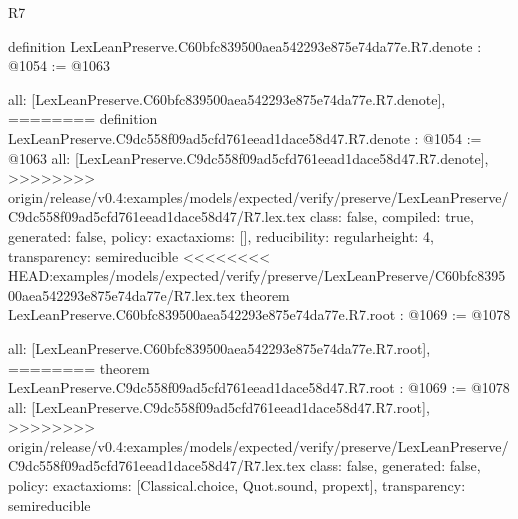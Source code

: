 \begin{lexlean}{R7}
\begin{coremodule}
{{{{{{{{{{{definition LexLeanPreserve.C60bfc839500aea542293e875e74da77e.R7.denote : @1054 := @1063 {
  all: [LexLeanPreserve.C60bfc839500aea542293e875e74da77e.R7.denote],
========
definition LexLeanPreserve.C9dc558f09ad5cfd761eead1dace58d47.R7.denote : @1054 := @1063 {
  all: [LexLeanPreserve.C9dc558f09ad5cfd761eead1dace58d47.R7.denote],
>>>>>>>> origin/release/v0.4:examples/models/expected/verify/preserve/LexLeanPreserve/C9dc558f09ad5cfd761eead1dace58d47/R7.lex.tex
  class: false,
  compiled: true,
  generated: false,
  policy: exact{axioms: []},
  reducibility: regular{height: 4},
  transparency: semireducible
}
<<<<<<<< HEAD:examples/models/expected/verify/preserve/LexLeanPreserve/C60bfc839500aea542293e875e74da77e/R7.lex.tex
theorem LexLeanPreserve.C60bfc839500aea542293e875e74da77e.R7.root : @1069 := @1078 {
  all: [LexLeanPreserve.C60bfc839500aea542293e875e74da77e.R7.root],
========
theorem LexLeanPreserve.C9dc558f09ad5cfd761eead1dace58d47.R7.root : @1069 := @1078 {
  all: [LexLeanPreserve.C9dc558f09ad5cfd761eead1dace58d47.R7.root],
>>>>>>>> origin/release/v0.4:examples/models/expected/verify/preserve/LexLeanPreserve/C9dc558f09ad5cfd761eead1dace58d47/R7.lex.tex
  class: false,
  generated: false,
  policy: exact{axioms: [Classical.choice, Quot.sound, propext]},
  transparency: semireducible
}

}}}}}}}}}}}}}
\end{coremodule}
\end{lexlean}

